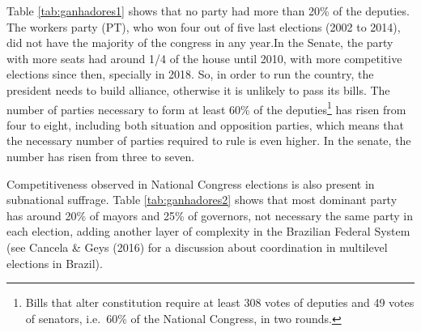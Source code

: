 \documentclass[
  12pt,
]{article}
\begin{document}
Table \ref{tab:ganhadores1} shows that no party had more than 20\% of
the deputies. The workers party (PT), who won four out of five last
elections (2002 to 2014), did not have the majority of the congress in
any year.In the Senate, the party with more seats had around 1/4 of the
house until 2010, with more competitive elections since then, specially
in 2018. So, in order to run the country, the president needs to build
alliance, otherwise it is unlikely to pass its bills. The number of
parties necessary to form at least 60\% of the deputies\footnote{Bills
  that alter constitution require at least 308 votes of deputies and 49
  votes of senators, i.e.~60\% of the National Congress, in two rounds.}
has risen from four to eight, including both situation and opposition
parties, which means that the necessary number of parties required to
rule is even higher. In the senate, the number has risen from three to
seven.

Competitiveness observed in National Congress elections is also present
in subnational suffrage. Table \ref{tab:ganhadores2} shows that most
dominant party has around 20\% of mayors and 25\% of governors, not
necessary the same party in each election, adding another layer of
complexity in the Brazilian Federal System (see Cancela \& Geys (2016)
for a discussion about coordination in multilevel elections in Brazil).
\end{document}
